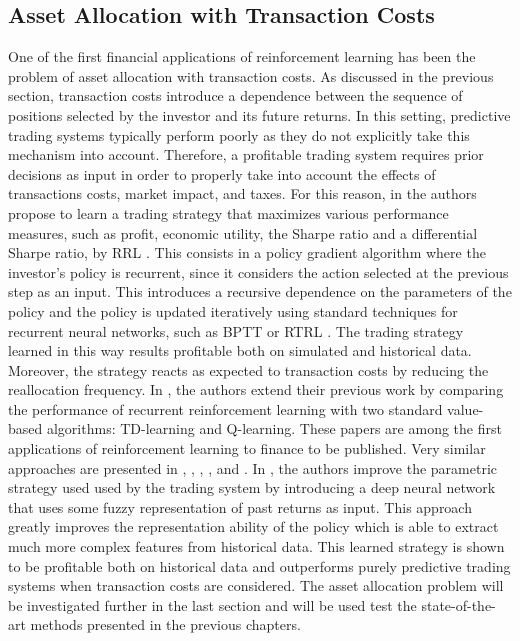\subsection{Asset Allocation with Transaction Costs}
One of the first financial applications of reinforcement learning has been the problem of asset allocation with transaction costs. As discussed in the previous section, transaction costs introduce a dependence between the sequence of positions selected by the investor and its future returns. In this setting, predictive trading systems typically perform poorly as they do not explicitly take this mechanism into account. Therefore, a profitable trading system requires prior decisions as input in order to properly take into account the effects of transactions costs, market impact, and taxes. For this reason, in \cite{moody1997optimization} the authors propose to learn a trading strategy that maximizes various performance measures, such as profit, economic utility, the Sharpe ratio and a differential Sharpe ratio, by \gls{RRL} \cite{jaeger2002tutorial}. This consists in a policy gradient algorithm where the investor's policy is recurrent, since it considers the action selected at the previous step as an input. This introduces a recursive dependence on the parameters of the policy and the policy is updated iteratively using standard techniques for recurrent neural networks, such as \gls{BPTT} \cite{werbos1990backpropagation} or \gls{RTRL} \cite{williams1989learning}. The trading strategy learned in this way results profitable both on simulated and historical data. Moreover, the strategy reacts as expected to transaction costs by reducing the reallocation frequency. In \cite{moody2001learning}, the authors extend their previous work by comparing the performance of recurrent reinforcement learning with two standard value-based algorithms: TD-learning and Q-learning. These papers are among the first applications of reinforcement learning to finance to be published. Very similar approaches are presented in \cite{choey1997nonlineareltit}, \cite{chapados2001cost}, \cite{gold2003FX}, \cite{casqueiro2006neuro}, \cite{dempster2006automated} and \cite{li2007short}. In \cite{deng2016deep}, the authors improve the parametric strategy used used by the trading system by introducing a deep neural network that uses some fuzzy representation of past returns as input. This approach greatly improves the representation ability of the policy which is able to extract much more complex features from historical data. This learned strategy is shown to be profitable both on historical data and outperforms purely predictive trading systems when transaction costs are considered. The asset allocation problem will be investigated further in the last section and will be used test the state-of-the-art methods presented in the previous chapters. 

